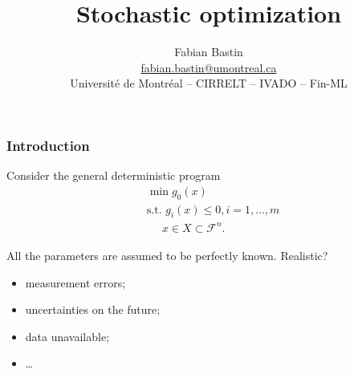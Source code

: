 \documentclass{beamer}
\title[Stochastic optimization]{Stochastic optimization}
\author[Fabian Bastin]{Fabian Bastin \\ \url{fabian.bastin@umontreal.ca} \\ Université de Montréal -- CIRRELT -- IVADO -- Fin-ML}
\date{}
\def\cR {{\mathcal{F}}}
\begin{document}
\frame{\titlepage}

\begin{frame}
\frametitle{Introduction}

Consider the general deterministic program
\[
\begin{split}
& \min g_0(x) \\
& \text{s.t. }g_i(x) \leq 0, i = 1,\ldots{},m \\
& \phantom{t.q. }x \in X \subset \cR^n.
\end{split}
\]

\mbox{}

All the parameters are assumed to be perfectly known. {\color{red} Realistic?}
\begin{itemize}
\item
measurement errors;
\item
uncertainties on the future;
\item
data unavailable;
\item
\ldots
\end{itemize}

\end{frame}
\end{document}
